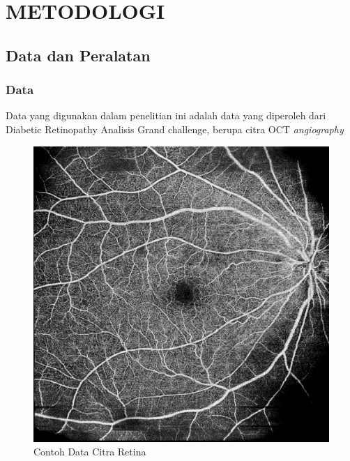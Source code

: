 \chapter{METODOLOGI}
\label{chap:3}


\section{Data dan Peralatan}
\label{sec:31}

\subsection{Data}
\label{sec:311}
Data yang digunakan dalam penelitian ini adalah data yang diperoleh dari Diabetic Retinopathy Analisis Grand challenge, berupa citra OCT \emph{angiography}

\begin{figure} [H] \centering
	\includegraphics[scale=0.2]{gambar/exampleimage.png}
	\caption{Contoh Data Citra Retina}
	\label{fig:citraRetina}
\end{figure}

